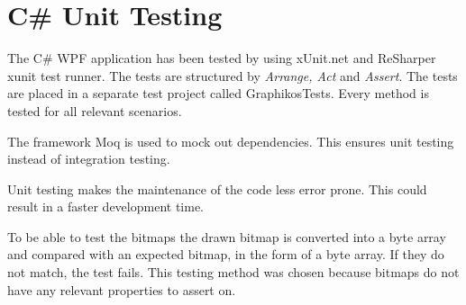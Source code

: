 \section{C\# Unit Testing}
The C\# WPF application has been tested by using xUnit.net and ReSharper xunit test runner. The tests are structured by \emph{Arrange, Act} and \emph{Assert}. The tests are placed in a separate test project called GraphikosTests. Every method is tested for all relevant scenarios.

The framework Moq is used to mock out dependencies. This ensures unit testing instead of integration testing.

Unit testing makes the maintenance of the code less error prone. This could result in a faster development time.

To be able to test the bitmaps the drawn bitmap is converted into a byte array and compared with an expected bitmap, in the form of a byte array. If they do not match, the test fails. This testing method was chosen because bitmaps do not have any relevant properties to assert on.